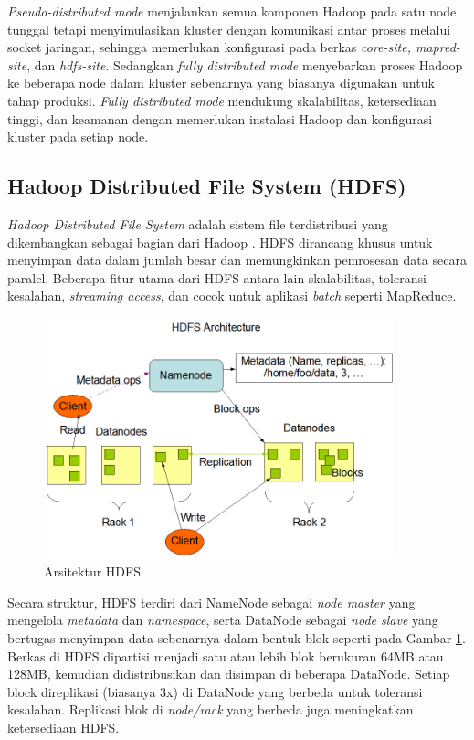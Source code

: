 \textit{Pseudo-distributed mode} menjalankan semua komponen Hadoop pada satu node tunggal tetapi menyimulasikan kluster dengan komunikasi antar proses melalui socket jaringan, sehingga memerlukan konfigurasi pada berkas \textit{core-site, mapred-site}, dan \textit{hdfs-site}. Sedangkan \textit{fully distributed mode} menyebarkan proses Hadoop ke beberapa node dalam kluster sebenarnya yang biasanya digunakan untuk tahap produksi. \textit{Fully distributed mode} mendukung skalabilitas, ketersediaan tinggi, dan keamanan dengan memerlukan instalasi Hadoop dan konfigurasi kluster pada setiap node.

\subsection{Hadoop Distributed File System (HDFS)}
\textit{Hadoop Distributed File System} adalah sistem file terdistribusi yang dikembangkan sebagai bagian dari Hadoop \cite{abhishekIntegratedHadoopCloud2017}. HDFS dirancang khusus untuk menyimpan data dalam jumlah besar dan memungkinkan pemrosesan data secara paralel. Beberapa fitur utama dari HDFS antara lain skalabilitas, toleransi kesalahan, \textit{streaming access}, dan cocok untuk aplikasi \textit{batch} seperti MapReduce.

\begin{figure}[h!]
    \centering
    \includegraphics[width=0.9\textwidth]{figures/ch02/hdfsarchitecture}
    \caption{Arsitektur HDFS \cite{ApacheHadoopHDFS}}
    \label{fig:hdfs-arch}
\end{figure}

Secara struktur, HDFS terdiri dari NameNode sebagai \textit{node master} yang mengelola \textit{metadata} dan \textit{namespace}, serta DataNode sebagai \textit{node slave} yang bertugas menyimpan data sebenarnya dalam bentuk blok seperti pada Gambar \ref{fig:hdfs-arch}. Berkas di HDFS dipartisi menjadi satu atau lebih blok berukuran 64MB atau 128MB, kemudian didistribusikan dan disimpan di beberapa DataNode. Setiap block direplikasi (biasanya 3x) di DataNode yang berbeda untuk toleransi kesalahan. Replikasi blok di \textit{node/rack} yang berbeda juga meningkatkan ketersediaan HDFS.

